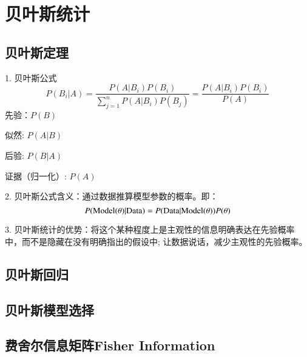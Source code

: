 \chapter{贝叶斯统计}
\section{贝叶斯定理}
1. 贝叶斯公式
\begin{equation}
    P(B_i|A)=\frac{P(A|B_i)P(B_i)}{\sum_{j=1}^{n}P(A|B_i)P(B_j)}
    =\frac{P(A|B_i)P(B_i)}{P(A)}
\end{equation}
先验：$P(B)$

似然:  $P(A|B)$

后验:  $P(B|A)$

证据（归一化）:  $P(A)$

2. 贝叶斯公式含义：通过数据推算模型参数的概率。即：
\begin{equation}
    P({\rm{Model}} (\theta)|{\rm{Data}})=
    P({\rm{Data}}|{\rm{Model}}(\theta))P(\theta)
\end{equation}


3. 贝叶斯统计的优势：将这个某种程度上是主观性的信息明确表达在先验概率中，而不是隐藏在没有明确指出的假设中; 让数据说话，减少主观性的先验概率。




\section{贝叶斯回归}

\section{贝叶斯模型选择}
\section{费舍尔信息矩阵Fisher Information}